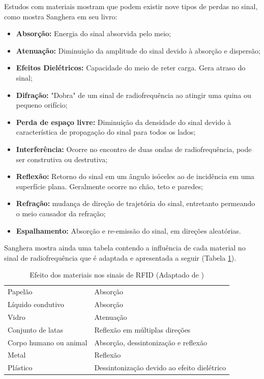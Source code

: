 Estudos com materiais mostram que podem existir nove tipos de perdas no sinal, como mostra Sanghera em seu livro\cite{book:SangheraRFID+}:
\begin{itemize}
    \item \textbf{Absorção:} Energia do sinal absorvida pelo meio;
    \item \textbf{Atenuação:} Diminuição da amplitude do sinal devido à absorção e dispersão;
    \item \textbf{Efeitos Dielétricos:} Capacidade do meio de reter carga. Gera atraso do sinal;
    \item \textbf{Difração:} "Dobra" de um sinal de radiofrequência ao atingir uma quina ou pequeno orifício;
    \item \textbf{Perda de espaço livre:} Diminuição da densidade do sinal devido à característica de propagação do sinal para todos os lados;
    \item \textbf{Interferência:} Ocorre no encontro de duas ondas de radiofrequência, pode ser construtiva ou destrutiva;
    \item \textbf{Reflexão:} Retorno do sinal em um ângulo isóceles ao de incidência em uma superfície plana. Geralmente ocorre no chão, teto e paredes;
    \item \textbf{Refração:} mudança de direção de trajetória do sinal, entretanto permeando o meio causador da refração;
    \item \textbf{Espalhamento:} Absorção e re-emissão do sinal, em direções aleatórias.
\end{itemize}
    
Sanghera mostra ainda uma tabela contendo a influência de cada material no sinal de radiofrequência \cite{book:SangheraRFID+} que é adaptada e apresentada a seguir (Tabela \ref{tab:InterfMateriais}).

\begin{table}[H]
\centering
\caption{Efeito dos materiais nos sinais de RFID (Adaptado de \cite{book:SangheraRFID+})}
\label{tab:InterfMateriais}
\begin{tabular}{p{5cm} p{7cm}}
\hline
\cellcolor{lightgray}{Material} & \cellcolor{lightgray}{Efeito no sinal RF}   \\ \hline
Papelão         &   Absorção        \\
Líquido condutivo    &   Absorção        \\
Vidro           &  Atenuação        \\
Conjunto de latas & Reflexão em múltiplas direções \\
Corpo humano ou animal & Absorção, dessintonização e reflexão \\ 
Metal & Reflexão \\
Plástico & Dessintonização devido ao efeito dielétrico \\ \hline
\end{tabular}
\end{table}


